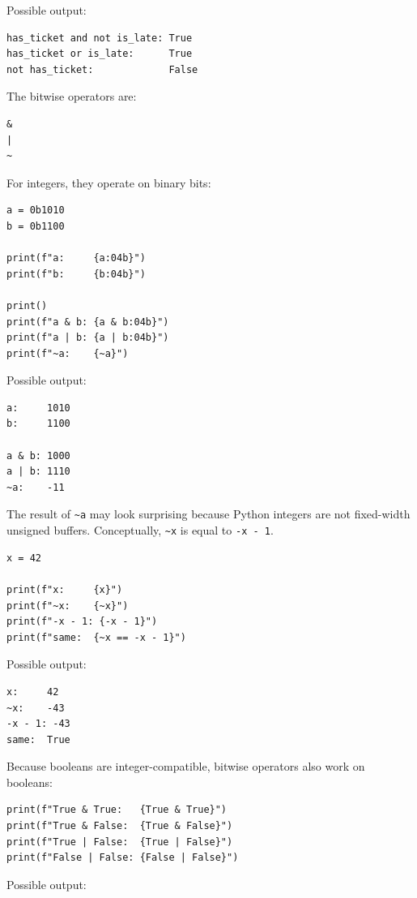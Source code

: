 Possible output:

\begin{verbatim}
has_ticket and not is_late: True
has_ticket or is_late:      True
not has_ticket:             False
\end{verbatim}

The bitwise operators are:

\begin{verbatim}
&
|
~
\end{verbatim}

For integers, they operate on binary bits:

\begin{verbatim}
a = 0b1010
b = 0b1100

print(f"a:     {a:04b}")
print(f"b:     {b:04b}")

print()
print(f"a & b: {a & b:04b}")
print(f"a | b: {a | b:04b}")
print(f"~a:    {~a}")
\end{verbatim}

Possible output:

\begin{verbatim}
a:     1010
b:     1100

a & b: 1000
a | b: 1110
~a:    -11
\end{verbatim}

The result of \texttt{\textasciitilde{}a} may look surprising because Python integers are not fixed-width unsigned buffers. Conceptually, \texttt{\textasciitilde{}x} is equal to \texttt{-x - 1}.

\begin{verbatim}
x = 42

print(f"x:     {x}")
print(f"~x:    {~x}")
print(f"-x - 1: {-x - 1}")
print(f"same:  {~x == -x - 1}")
\end{verbatim}

Possible output:

\begin{verbatim}
x:     42
~x:    -43
-x - 1: -43
same:  True
\end{verbatim}

Because booleans are integer-compatible, bitwise operators also work on booleans:

\begin{verbatim}
print(f"True & True:   {True & True}")
print(f"True & False:  {True & False}")
print(f"True | False:  {True | False}")
print(f"False | False: {False | False}")
\end{verbatim}

Possible output:

